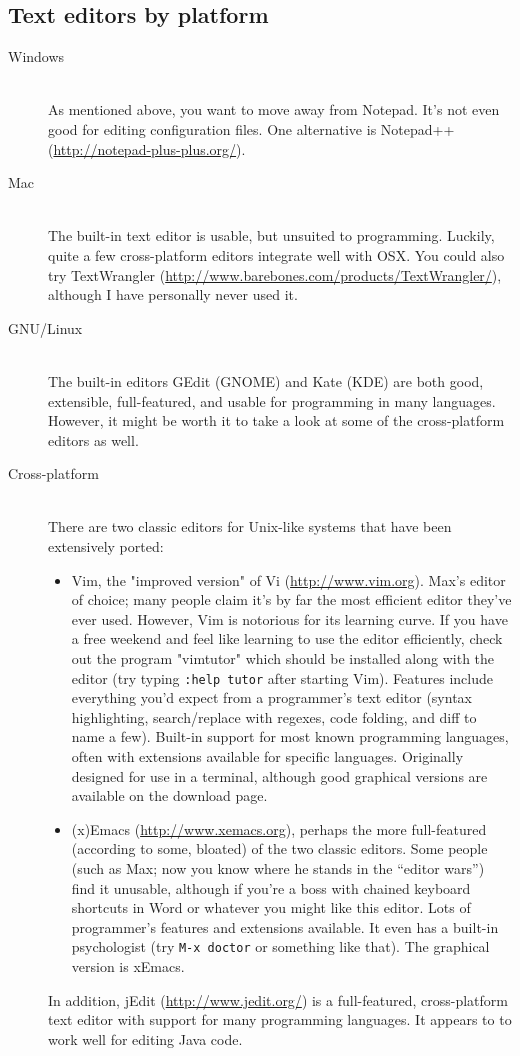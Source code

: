 \documentclass{article}
\begin{document}
\subsection{Text editors by platform}
\begin{description}
    \item[Windows] \hfill \\
        As mentioned above, you want to move away from Notepad. It's not even good for editing configuration files. One alternative is Notepad++ (\url{http://notepad-plus-plus.org/}). 
    \item[Mac] \hfill \\
        The built-in text editor is usable, but unsuited to programming. Luckily, quite a few cross-platform editors integrate well with OSX. You could also try TextWrangler (\url{http://www.barebones.com/products/TextWrangler/}), although I have personally never used it.
    \item[GNU/Linux] \hfill \\
        The built-in editors GEdit (GNOME) and Kate (KDE) are both good, extensible, full-featured, and usable for programming in many languages. However, it might be worth it to take a look at some of the cross-platform editors as well.
    \item[Cross-platform] \hfill \\
        There are two classic editors for Unix-like systems that have been extensively ported: 
        \begin{itemize}
            \item Vim, the "improved version" of Vi (\url{http://www.vim.org}). Max's editor of choice; many people claim it's by far the most efficient editor they've ever used. However, Vim is notorious for its learning curve. If you have a free weekend and feel like learning to use the editor efficiently, check out the program "vimtutor" which should be installed along with the editor (try typing \texttt{:help tutor} after starting Vim). Features include everything you'd expect from a programmer's text editor (syntax highlighting, search/replace with regexes, code folding, and diff to name a few). Built-in support for most known programming languages, often with extensions available for specific languages. Originally designed for use in a terminal, although good graphical versions are available on the download page.
            \item (x)Emacs (\url{http://www.xemacs.org}), perhaps the more full-featured (according to some, bloated) of the two classic editors. Some people (such as Max; now you know where he stands in the ``editor wars'') find it unusable, although if you're a boss with chained keyboard shortcuts in Word or whatever you might like this editor. Lots of programmer's features and extensions available. It even has a built-in psychologist (try \texttt{M-x doctor} or something like that). The graphical version is xEmacs.
        \end{itemize}
        In addition, jEdit (\url{http://www.jedit.org/}) is a full-featured, cross-platform text editor with support for many programming languages. It appears to to work well for editing Java code.
\end{description}
\end{document}
